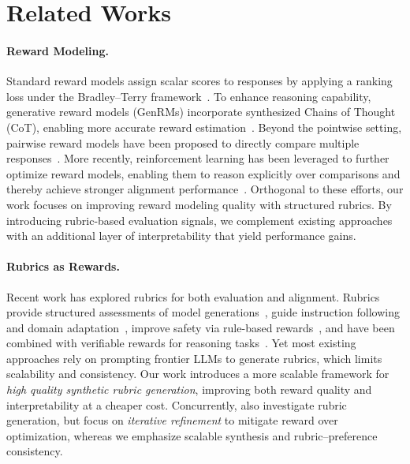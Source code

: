 \section{Related Works}
\label{sec:related_work}

\paragraph{Reward Modeling.} 
Standard reward models assign scalar scores to responses by applying a ranking loss under the Bradley–Terry framework~\citep{bradley1952rank,liu2025skywork}. To enhance reasoning capability, generative reward models (GenRMs) incorporate synthesized Chains of Thought (CoT), enabling more accurate reward estimation~\citep{ankner2024critique,yu-etal-2025-self,zhang2025generative,liang-etal-2025-generative}. Beyond the pointwise setting, pairwise reward models have been proposed to directly compare multiple responses~\citep{xu2025unified,liu2025pairjudge}. 
More recently, reinforcement learning has been leveraged to further optimize reward models, enabling them to reason explicitly over comparisons and thereby achieve stronger alignment performance~\citep{chen2025judgelrm,chen2025rm,whitehouse2025j1,guo2025reward}. 
Orthogonal to these efforts, our work focuses on improving reward modeling quality with structured rubrics. By introducing rubric-based evaluation signals, we complement existing approaches with an additional layer of interpretability that yield performance gains.

\paragraph{Rubrics as Rewards.}  
Recent work has explored rubrics for both evaluation and alignment.
Rubrics provide structured assessments of model generations~\citep{arora2025healthbench,hashemi2024llm,pathak2025rubric,lin2025wildbench}, guide instruction following and domain adaptation~\citep{viswanathan2025checklists,gunjal2025rubrics}, improve safety via rule-based rewards~\citep{mu2024rule}, and have been combined with verifiable rewards for reasoning tasks~\citep{huang2025reinforcement,zhou2025breaking}.
Yet most existing approaches rely on prompting frontier LLMs to generate rubrics, which limits scalability and consistency. 
{Our work introduces a more scalable framework for \emph{high quality synthetic rubric generation}}, improving both reward quality and interpretability at a cheaper cost.
Concurrently, \citet{zhang2025chasing} also investigate rubric generation, but focus on \emph{iterative refinement} to mitigate reward over optimization, whereas we emphasize scalable synthesis and rubric–preference consistency.
